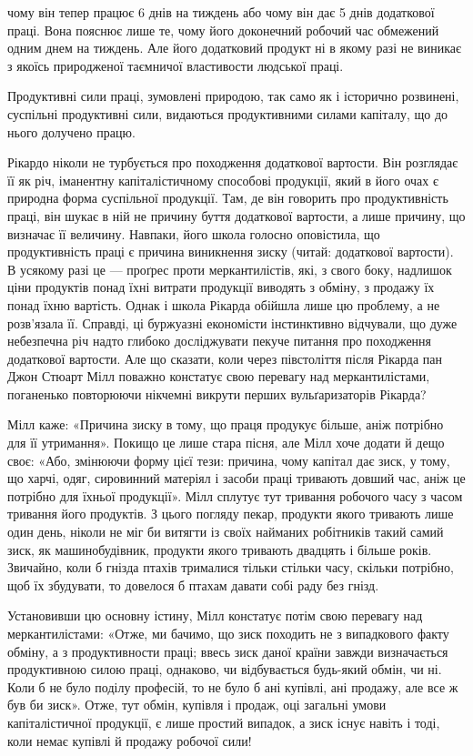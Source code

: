 \parcont{}  %
чому він тепер працює 6 днів на тиждень або чому він дає 5 днів
додаткової праці. Вона пояснює лише те, чому його доконечний
робочий час обмежений одним днем на тиждень. Але його додатковий
продукт ні в якому разі не виникає з якоїсь природженої
таємничої властивости людської праці.

Продуктивні сили праці, зумовлені природою, так само як
і історично розвинені, суспільні продуктивні сили, видаються
продуктивними силами капіталу, що до нього долучено працю.

Рікардо ніколи не турбується про походження додаткової
вартости. Він розглядає її як річ, іманентну капіталістичному
способові продукції, який в його очах є природна форма суспільної
продукції. Там, де він говорить про продуктивність праці,
він шукає в ній не причину буття додаткової вартости, а лише
причину, що визначає її величину. Навпаки, його школа голосно
оповістила, що продуктивність праці є причина виникнення
зиску (читай: додаткової вартости). В усякому разі це — проґрес
проти меркантилістів, які, з свого боку, надлишок ціни
продуктів понад їхні витрати продукції виводять з обміну, з
продажу їх понад їхню вартість. Однак і школа Рікарда обійшла
лише цю проблему, а не розв’язала її. Справді, ці буржуазні
економісти інстинктивно відчували, що дуже небезпечна річ надто
глибоко досліджувати пекуче питання про походження додаткової
вартости. Але що сказати, коли через півстоліття після Рікарда
пан Джон Стюарт Мілл поважно констатує свою перевагу над
меркантилістами, поганенько повторюючи нікчемні викрути перших
вульґаризаторів Рікарда?

Мілл каже: «Причина зиску в тому, що праця продукує
більше, аніж потрібно для її утримання». Покищо це лише стара
пісня, але Мілл хоче додати й дещо своє: «Або, змінюючи форму
цієї тези: причина, чому капітал дає зиск, у тому, що харчі,
одяг, сировинний матеріял і засоби праці тривають довший час,
аніж це потрібно для їхньої продукції». Мілл сплутує тут тривання
робочого часу з часом тривання його продуктів. З цього
погляду пекар, продукти якого тривають лише один день, ніколи
не міг би витягти із своїх найманих робітників такий самий зиск,
як машинобудівник, продукти якого тривають двадцять і більше
років. Звичайно, коли б гнізда птахів трималися тільки стільки
часу, скільки потрібно, щоб їх збудувати, то довелося б птахам
давати собі раду без гнізд.

Установивши цю основну істину, Мілл констатує потім свою
перевагу над меркантилістами: «Отже, ми бачимо, що зиск походить
не з випадкового факту обміну, а з продуктивности праці;
ввесь зиск даної країни завжди визначається продуктивною силою
праці, однаково, чи відбувається будь-який обмін, чи ні. Коли б
не було поділу професій, то не було б ані купівлі, ані продажу,
але все ж був би зиск». Отже, тут обмін, купівля і продаж, оці
загальні умови капіталістичної продукції, є лише простий випадок,
а зиск існує навіть і тоді, коли немає купівлі й продажу
робочої сили!
\parbreak{}  %
